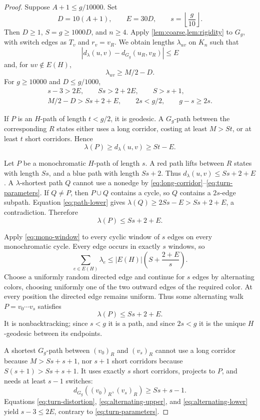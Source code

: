 \documentclass[11pt,a4paper]{article}
\theoremstyle{plain}
\theoremstyle{definition}
\theoremstyle{remark}
\newcommand{\Gg}{G_g}
\begin{document}
\label{pf:turn}
\lemturn*
\begin{proof}
Suppose $A+1\le g/10000$. Set
\[
 D=10(A+1),\qquad E=30D,\qquad s=\left\lfloor\frac g{10}\right\rfloor.
\tag{A.6}
\]
Then $D\ge1$, $S=g\ge1000D$, and $n\ge4$. Apply \cref{lem:coarse,lem:rigidity} to $\Gg$, with switch edges as $T_v$ and $r_v=v_R$. We obtain lengths $\lambda_{uv}$ on $K_n$ such that
\[
 |d_\lambda(u,v)-d_{\Gg}(u_R,v_R)|\le E
\tag{A.7}\label{eq:turn-distortion}
\]
and, for $uv\notin E(H)$,
\[
 \lambda_{uv}\ge M/2-D.
\tag{A.8}\label{eq:long-corridor}
\]
For $g\ge10000$ and $D\le g/1000$,
\[
\begin{gathered}
s-3>2E,\qquad Ss>2+2E,\qquad S>s+1,\\
M/2-D>Ss+2+E,\qquad 2s<g/2,\qquad g-s\ge2s.
\tag{A.9}\label{eq:turn-parameters}
\end{gathered}
\]

If $P$ is an $H$-path of length $t<g/2$, it is geodesic. A $\Gg$-path between the corresponding $R$ states either uses a long corridor, costing at least $M>St$, or at least $t$ short corridors. Hence
\[
 \lambda(P)\ge d_\lambda(u,v)\ge St-E.
\tag{A.10}\label{eq:path-lower}
\]

Let $P$ be a monochromatic $H$-path of length $s$. A red path lifts between $R$ states with length $Ss$, and a blue path with length $Ss+2$. Thus $d_\lambda(u,v)\le Ss+2+E$. A $\lambda$-shortest path $Q$ cannot use a nonedge by \eqref{eq:long-corridor}--\eqref{eq:turn-parameters}. If $Q\ne P$, then $P\cup Q$ contains a cycle, so $Q$ contains a $2s$-edge subpath. Equation \eqref{eq:path-lower} gives $\lambda(Q)\ge2Ss-E>Ss+2+E$, a contradiction. Therefore
\[
 \lambda(P)\le Ss+2+E.
\tag{A.11}\label{eq:mono-window}
\]

Apply \eqref{eq:mono-window} to every cyclic window of $s$ edges on every monochromatic cycle. Every edge occurs in exactly $s$ windows, so
\[
 \sum_{e\in E(H)}\lambda_e\le |E(H)|\left(S+\frac{2+E}{s}\right).
\tag{A.12}
\]
Choose a uniformly random directed edge and continue for $s$ edges by alternating colors, choosing uniformly one of the two outward edges of the required color. At every position the directed edge remains uniform. Thus some alternating walk $P=v_0\cdots v_s$ satisfies
\[
 \lambda(P)\le Ss+2+E.
\tag{A.13}\label{eq:alternating-upper}
\]
It is nonbacktracking; since $s<g$ it is a path, and since $2s<g$ it is the unique $H$-geodesic between its endpoints.

A shortest $\Gg$-path between $(v_0)_R$ and $(v_s)_R$ cannot use a long corridor because $M>Ss+s+1$, nor $s+1$ short corridors because $S(s+1)>Ss+s+1$. It uses exactly $s$ short corridors, projects to $P$, and needs at least $s-1$ switches:
\[
 d_{\Gg}((v_0)_R,(v_s)_R)\ge Ss+s-1.
\tag{A.14}\label{eq:alternating-lower}
\]
Equations \eqref{eq:turn-distortion}, \eqref{eq:alternating-upper}, and \eqref{eq:alternating-lower} yield $s-3\le2E$, contrary to \eqref{eq:turn-parameters}.
\end{proof}
\end{document}
